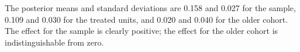 The posterior means and standard deviations are 0.158 and 0.027 for the sample, 0.109 and 0.030 for the treated units, and 0.020 and 0.040 for the older cohort. The effect for the sample is clearly positive; the effect for the older cohort is indistinguishable from zero.
